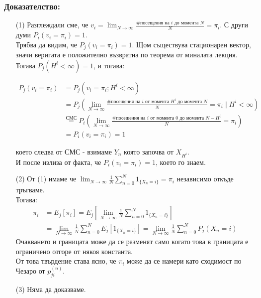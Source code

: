 \documentclass{article}
\begin{document}
\subsubsection*{Доказателство:}
\begin{enumerate}
\item[(1)] Разглеждали сме, че $v_i = \lim_{N\to\infty} \frac{\text{\# посещения на }i\text{ до момента }N}{N} = \pi_i$. С други думи $P_i(v_i = \pi_i) = 1$. \\
Трябва да видим, че $P_j(v_i = \pi_i) = 1$. Щом съществува стационарен вектор, значи веригата е положително възвратна по теорема от миналата лекция. \\
Тогава $P_j(H^i < \infty) = 1$, и тогава:

\begin{align*}
P_j(v_i = \pi_i) &= P_j(v_i = \pi_i; H^i < \infty) \\
&= P_j\left(\lim_{N\to\infty} \frac{\text{\# посещения на }i\text{ от момента }H^i\text{ до момента }N}{N} = \pi_i \mid H^i < \infty\right) \\
&\overset{СМС}= P_i\left(\lim_{N\to\infty} \frac{\text{\# посещения на }i\text{ от момента }0\text{ до момента }N-H^i}{N} = \pi_i\right) \\ 
&=P_i(v_i=\pi_i)=1
\end{align*}

което следва от СМС - взимаме $Y_n$ която започва от $X_{H^i}$. \\
И после излиза от факта, че $P_i(v_i = \pi_i) = 1$, което го знаем.

\item[(2)] От (1) имаме че $\lim_{N\to\infty} \frac{1}{N}\sum_{n=0}^N 1_{\{X_n = i\}} = \pi_i$ независимо откъде тръгваме. \\
Тогава:
\begin{align*}
\pi_i &= E_j[\pi_i] = E_j\left[\lim_{N\to\infty} \frac{1}{N}\sum_{n=0}^N 1_{\{X_n = i\}}\right] \\
&= \lim_{N\to\infty} \frac{1}{N}\sum_{n=0}^N E_j[1_{\{X_n = i\}}] = \lim_{N\to\infty} \frac{1}{N}\sum_{n=0}^N P_j(X_n = i)
\end{align*}
Очакването и границата може да се разменят само когато това в границата е ограничено отгоре от някоя константа. \\
От това твърдение става ясно, че $\pi_i$ може да се намери като сходимост по Чезаро от $p_{ji}^{(n)}$.

\item[(3)] Няма да доказваме.
\end{enumerate}
\end{document}

